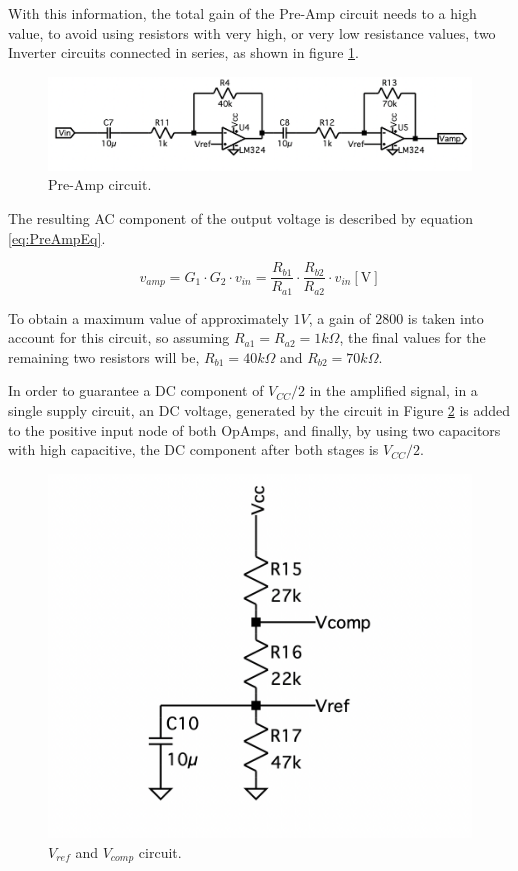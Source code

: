 With this information, the total gain of the Pre-Amp circuit needs to a high value, to avoid using resistors with very high, or very low resistance values, two Inverter circuits connected in series, as shown in figure \ref{fig:PreAmp}.

\begin{figure}[H]
    \centering
    \includegraphics*[scale = 0.5]{Images/PreAmp circuit.png}
    \caption{Pre-Amp circuit.}
    \label{fig:PreAmp}
\end{figure}

The resulting AC component of the output voltage is described by equation \ref{eq:PreAmpEq}.

\begin{equation}
    v_{amp} = G_1 \cdot G_2 \cdot v_{in} = \frac{R_{b1}}{R_{a1}} \cdot \frac{R_{b2}}{R_{a2}} \cdot v_{in} [\si{\volt}]
    \label{eq:PreAmpEq}
\end{equation}

To obtain a maximum value of approximately $1V$, a gain of $2800$ is taken into account for this circuit, so assuming $R_{a1} = R_{a2} = 1k\Omega$, the final values for the remaining two resistors will be, $R_{b1} = 40k\Omega$ and $R_{b2} = 70k\Omega$.

In order to guarantee a DC component of $V_{CC}/2$ in the amplified signal, in a single supply circuit, an DC voltage, generated by the circuit in Figure \ref{fig:VrefVcomp} is added to the positive input node of both OpAmps, and finally, by using two capacitors with high capacitive, the DC component after both stages is $V_{CC}/2$.

\begin{figure}[H]
    \centering
    \includegraphics*[scale = 0.3]{Images/VrefVcomp.png}
    \caption{$V_{ref}$ and $V_{comp}$ circuit.}
    \label{fig:VrefVcomp}
\end{figure}


